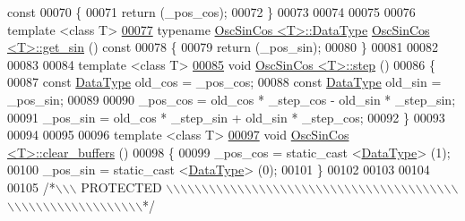 \begin{DoxyCode}
{      const}
00070 \{
00071     \textcolor{keywordflow}{return} (\_pos\_cos);
00072 \}
00073 
00074 
00075 
00076 \textcolor{keyword}{template} <\textcolor{keyword}{class} T>
\hypertarget{a00112_source_l00077}{}\hyperlink{a00020_a3e336802d9e10288483d477bfdf50c20}{00077} \textcolor{keyword}{typename} \hyperlink{a00020_af91237051e92ce0af7aaf38b1826244d}{OscSinCos <T>::DataType} \hyperlink{a00020}{OscSinCos <T>::get\_sin} () \textcolor{keyword}{
      const}
00078 \{
00079     \textcolor{keywordflow}{return} (\_pos\_sin);
00080 \}
00081 
00082 
00083 
00084 \textcolor{keyword}{template} <\textcolor{keyword}{class} T>
\hypertarget{a00112_source_l00085}{}\hyperlink{a00020_a442975ce6388271ea78998c080364e08}{00085} \textcolor{keywordtype}{void}    \hyperlink{a00020}{OscSinCos <T>::step} ()
00086 \{
00087     \textcolor{keyword}{const} \hyperlink{a00020_af91237051e92ce0af7aaf38b1826244d}{DataType}  old\_cos = \_pos\_cos;
00088     \textcolor{keyword}{const} \hyperlink{a00020_af91237051e92ce0af7aaf38b1826244d}{DataType}  old\_sin = \_pos\_sin;
00089 
00090     \_pos\_cos = old\_cos * \_step\_cos - old\_sin * \_step\_sin;
00091     \_pos\_sin = old\_cos * \_step\_sin + old\_sin * \_step\_cos;
00092 \}
00093 
00094 
00095 
00096 \textcolor{keyword}{template} <\textcolor{keyword}{class} T>
\hypertarget{a00112_source_l00097}{}\hyperlink{a00020_a1be4a9ec10517ae2615d2925c05d7d29}{00097} \textcolor{keywordtype}{void}    \hyperlink{a00020}{OscSinCos <T>::clear\_buffers} ()
00098 \{
00099     \_pos\_cos = static\_cast <\hyperlink{a00020_af91237051e92ce0af7aaf38b1826244d}{DataType}> (1);
00100     \_pos\_sin = static\_cast <\hyperlink{a00020_af91237051e92ce0af7aaf38b1826244d}{DataType}> (0);
00101 \}
00102 
00103 
00104 
00105 \textcolor{comment}{/*\(\backslash\)\(\backslash\)\(\backslash\) PROTECTED \(\backslash\)\(\backslash\)\(\backslash\)\(\backslash\)\(\backslash\)\(\backslash\)\(\backslash\)\(\backslash\)\(\backslash\)\(\backslash\)\(\backslash\)\(\backslash\)\(\backslash\)\(\backslash\)\(\backslash\)\(\backslash\)\(\backslash\)\(\backslash\)\(\backslash\)\(\backslash\)\(\backslash\)\(\backslash\)\(\backslash\)\(\backslash\)\(\backslash\)\(\backslash\)\(\backslash\)\(\backslash\)\(\backslash\)\(\backslash\)\(\backslash\)\(\backslash\)\(\backslash\)\(\backslash\)\(\backslash\)\(\backslash\)\(\backslash\)\(\backslash\)\(\backslash\)\(\backslash\)\(\backslash\)\(\backslash\)\(\backslash\)\(\backslash\)\(\backslash\)\(\backslash\)\(\backslash\)\(\backslash\)\(\backslash\)\(\backslash\)\(\backslash\)\(\backslash\)\(\backslash\)\(\backslash\)\(\backslash\)\(\backslash\)\(\backslash\)\(\backslash\)\(\backslash\)\(\backslash\)*/}

\end{DoxyCode}
